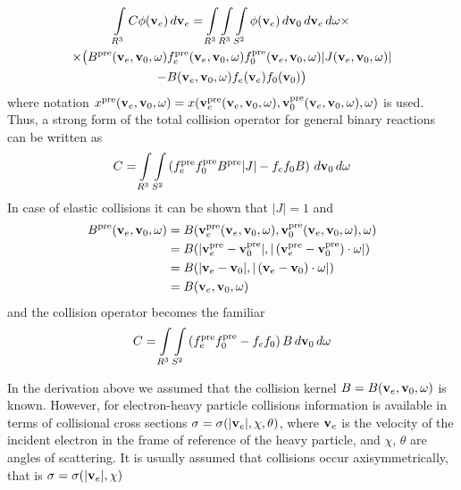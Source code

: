 \documentclass{article}[draft]
\begin{document}
\begin{multline*}
\myint_{R^3} C \phi\of{\vect{v}_e} \diff{\vect{v}_e} 
=
\myint_{R^3} \myint_{R^3} \myint_{S^2} 
\phi\of{\vect{v}_e} 
\diff{\vect{v}_0} \diff{\vect{v}_e} \diff{\vect{\omega}}
\times
\\
\times
\big(
B^\text{pre}\of{\vect{v}_e, \vect{v}_0, \vect{\omega}}  
f_e^\text{pre}\of{\vect{v}_e, \vect{v}_0, \vect{\omega}}
f_0^\text{pre}\of{\vect{v}_e, \vect{v}_0, \vect{\omega}} 
|J\of{\vect{v}_e, \vect{v}_0, \vect{\omega}}|
\\
-
B\of{\vect{v}_e, \vect{v}_0, \vect{\omega}} 
f_e\of{\vect{v}_e} f_0\of{\vect{v}_0} 
\big)
\end{multline*}
where notation $x^\text{pre}\of{\vect{v}_e, \vect{v}_0, \vect{\omega}} = x\of{\vect{v}_e^\text{pre} \of{\vect{v}_e, \vect{v}_0, \vect{\omega}}, \vect{v}_0^\text{pre} \of{\vect{v}_e, \vect{v}_0, \vect{\omega}}, \vect{\omega}}$ is used. Thus, a strong form of the total collision operator for general binary reactions can be written as
\begin{align*}
C = 
\int\limits_{R^3} \int\limits_{S^2} 
\left(
f_e^\text{pre}
f_0^\text{pre}
B^\text{pre} 
|J|
-
f_e
f_0
B
\right)
\, d\mathbf{v}_0 \, d\mathbf{\omega}
\end{align*}
In case of elastic collisions it can be shown that $|J| = 1$ and
\begin{align*}
B^\text{pre}\of{\vect{v}_e, \vect{v}_0, \vect{\omega}} &=
B\of{\vect{v}_e^\text{pre} \of{\vect{v}_e, \vect{v}_0, \vect{\omega}}, \vect{v}_0^\text{pre} \of{\vect{v}_e, \vect{v}_0, \vect{\omega}}, \vect{\omega}} 
\\
&=
B\of{|\vect{v}_e^\text{pre}- \vect{v}_0^\text{pre}|, |\left(\vect{v}_e^\text{pre}- \vect{v}_0^\text{pre}\right)\cdot\vect{\omega}|} 
\\
&=
B\of{|\vect{v}_e- \vect{v}_0|, |\left(\vect{v}_e- \vect{v}_0\right)\cdot\vect{\omega}|}
\\
&=
B\of{\vect{v}_e, \vect{v}_0, \vect{\omega}} 
\end{align*}
and the collision operator becomes the familiar
\begin{align*}
C = 
\int\limits_{R^3} \int\limits_{S^2} 
\left(
f_e^\text{pre}
f_0^\text{pre}
-
f_e
f_0
\right)
B
\, d\mathbf{v}_0 \, d\mathbf{\omega}
\end{align*}

In the derivation above we assumed that the collision kernel $B=B\of{\vect{v}_e, \vect{v}_0, \vect{\omega}}$ is known. However, for electron-heavy particle collisions information is available in terms of collisional cross sections $\sigma = \sigma\of{|\vect{v}_e|, \chi, \theta}$, where $\mathbf{v}_e$ is the velocity of the incident electron in the frame of reference of the heavy particle, and $\chi$, $\theta$ are angles of scattering. It is usually assumed that collisions occur axisymmetrically, that is $\sigma = \sigma\of{|\vect{v}_e|, \chi}$
\end{document}
